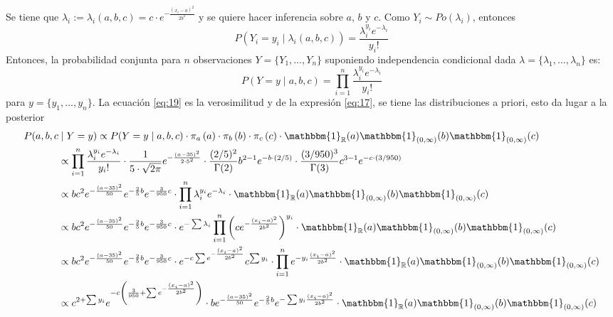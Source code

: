 Se tiene que $\lambda_{i} := \lambda_{i}(a,b,c) = c\cdot e^{- \frac{(x_i -a)^2}{2b^2}}$ y se quiere hacer inferencia sobre $a$, $b$ y $c$. Como $Y_i\sim Po(\lambda_{i})$, entonces
\begin{equation} \label{eq:18}
	P(Y_i = y_i \mid \lambda_{i} (a,b,c)) = \frac{\lambda_{i}^{y_i} e^{-\lambda_{i}}}{y_i !}
\end{equation}
Entonces, la probabilidad conjunta para $n$ observaciones $Y=\{Y_{1}, \dots, Y_{n}\}$ suponiendo independencia condicional dada $\lambda = \{\lambda_{1}, \dots, \lambda_{n}\}$ es:
\begin{equation}\label{eq:19}
	P(Y = y \mid a,b,c) = \prod_{i=1}^{n} \frac{\lambda_{i}^{y_i} e^{-\lambda_{i}}}{y_i !}
\end{equation}
para $y=\{y_{1}, \dots, y_{n}\}$. La ecuación \eqref{eq:19} es la verosimilitud y de la expresión \eqref{eq:17}, se tiene las distribuciones a priori, esto da lugar a la posterior
\begin{equation} \label{eq:20}
	\begin{aligned}
		P(a,b,c &\mid Y = y)
		\propto P(Y = y \mid a,b,c) \cdot \pi_{a} \left(a\right) \cdot \pi_{b} \left(b\right) \cdot \pi_{c} \left(c\right) \cdot \mathbbm{1}_{\mathbb{R}} (a) \mathbbm{1}_{(0,\infty)} (b) \mathbbm{1}_{(0,\infty)} (c)\\
		&\propto \prod_{i=1}^{n} \frac{\lambda_{i}^{y_i} e^{-\lambda_{i}}}{y_i !}
		\cdot \frac{1}{5\cdot \sqrt{2\pi}} e^{-\frac{(a - 35)^2}{2 \cdot 5^2}} \cdot  \frac{(2/5)^2}{\Gamma(2)} b^{2-1} e^{-b \cdot (2/5)} \cdot  \frac{(3/950)^3}{\Gamma(3)} c^{3-1} e^{-c \cdot (3/950)} \\
		&\propto bc^{2} e^{-\frac{(a - 35)^2}{50}} e^{-\frac{2}{5}b} e^{-\frac{3}{950}c} \cdot \prod_{i=1}^{n} \lambda_{i}^{y_i} e^{-\lambda_{i}} \cdot \mathbbm{1}_{\mathbb{R}} (a) \mathbbm{1}_{(0,\infty)} (b) \mathbbm{1}_{(0,\infty)} (c)\\
		& \propto bc^{2} e^{-\frac{(a - 35)^2}{50}} e^{-\frac{2}{5}b} e^{-\frac{3}{950}c} \cdot e^{-\sum \lambda_{i}} \prod_{i=1}^{n} \left( c e^{- \frac{(x_i -a)^2}{2b^2}} \right)^{y_i}  \cdot \mathbbm{1}_{\mathbb{R}} (a) \mathbbm{1}_{(0,\infty)} (b) \mathbbm{1}_{(0,\infty)} (c)\\
		& \propto bc^{2} e^{-\frac{(a - 35)^2}{50}} e^{-\frac{2}{5}b} e^{-\frac{3}{950}c} \cdot e^{-c\sum e^{- \frac{(x_i -a)^2}{2b^2}}} c^{\sum y_i} \cdot \prod_{i=1}^{n} e^{- y_i\frac{(x_i -a)^2}{2b^2}} \cdot \mathbbm{1}_{\mathbb{R}} (a) \mathbbm{1}_{(0,\infty)} (b) \mathbbm{1}_{(0,\infty)} (c)\\
		& \propto c^{2 + \sum y_i} e^{-c \left(\frac{3}{950} + \sum e^{- \frac{(x_i -a)^2}{2b^2}}\right)} \cdot b e^{-\frac{(a - 35)^2}{50}} e^{-\frac{2}{5}b} e^{- \sum y_i\frac{(x_i -a)^2}{2b^2}} \cdot \mathbbm{1}_{\mathbb{R}} (a) \mathbbm{1}_{(0,\infty)} (b) \mathbbm{1}_{(0,\infty)} (c)
	\end{aligned}
\end{equation}
